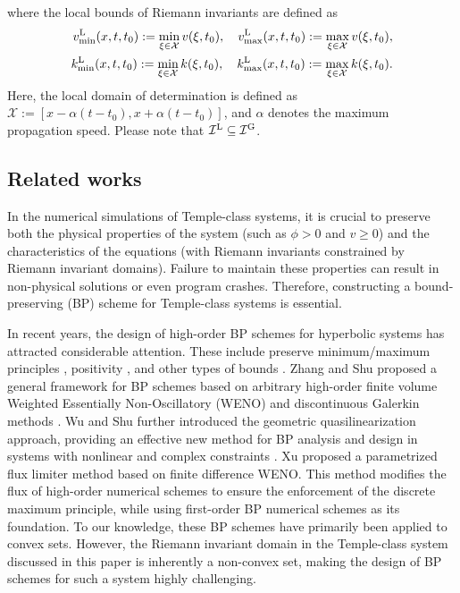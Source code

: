 \documentclass[times,final,11pt]{elsarticle}
\numberwithin{equation}{section}
\theoremstyle{definition}
\theoremstyle{remark}
\begin{document}
where the local bounds of Riemann invariants are defined as
\begin{equation*}\label{eq:412}
\begin{aligned}
	v^{\rm L}_{\min}(x,t,t_0) := \min_{\xi \in  \mathcal{X}} v(\xi,t_0), \quad v^{\rm L}_{\max}(x,t,t_0) := \max_{\xi \in  \mathcal{X}} v(\xi,t_0), \\
	k^{\rm L}_{\min}(x,t,t_0) := \min_{\xi \in  \mathcal{X}} k(\xi,t_0), \quad k^{\rm L}_{\max}(x,t,t_0) := \max_{\xi \in  \mathcal{X}} k(\xi,t_0).
\end{aligned}
\end{equation*}
Here, the local domain of determination is defined as $\mathcal{X}:=[x-\alpha(t-t_0),x+\alpha(t-t_0)]$, and $\alpha$ denotes the maximum propagation speed. Please note that $\mathcal{I}^{\rm L} \subseteq \mathcal{I}^{\rm G}$.

\subsection{Related works}
In the numerical simulations of Temple-class systems, it is crucial to preserve both the physical properties of the system (such as $\phi > 0$ and $v \geq 0$) and the characteristics of the equations (with Riemann invariants constrained by Riemann invariant domains). Failure to maintain these properties can result in non-physical solutions or even program crashes. Therefore, constructing a bound-preserving (BP) scheme for Temple-class systems is essential.

In recent years, the design of high-order BP schemes for hyperbolic systems has attracted considerable attention. These include preserve minimum/maximum principles \cite{zhang2010maximum,xu2014parametrized,Lv2014EntropyboundedDG,AndersoDobrevKolevKuzminQuezadaRiebenTomov2017}, positivity \cite{zhang2011maximum,wu2018positivity,WuShu2019}, and other types of bounds \cite{wu2021minimum,WuTang2015,wu2017design,mabuza2018local,Dmitri2021}. Zhang and Shu proposed a general framework for BP schemes based on arbitrary high-order finite volume Weighted Essentially Non-Oscillatory (WENO) and discontinuous Galerkin methods \cite{zhang2011maximum,zhang2010maximum}. Wu and Shu further introduced the geometric quasilinearization approach, providing an effective new method for BP analysis and design in systems with nonlinear and complex constraints \cite{wu2023geometric}. Xu \cite{xu2014parametrized} proposed a parametrized flux limiter method based on finite difference WENO. This method modifies the flux of high-order numerical schemes to ensure the enforcement of the discrete maximum principle, while using first-order BP numerical schemes as its foundation. To our knowledge, these BP schemes have primarily been applied to convex sets. However, the Riemann invariant domain in the Temple-class system discussed in this paper is inherently a non-convex set, making the design of BP schemes for such a system highly challenging.
\end{document}
